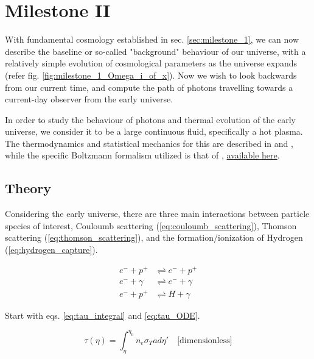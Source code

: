 \section{Milestone II}\label{sec:milestone_2}
With fundamental cosmology established in sec. \ref{sec:milestone_1}, we can now describe the baseline or so-called "background" behaviour of our universe, with a relatively simple evolution of cosmological parameters as the universe expands (refer fig. \ref{fig:milestone_1_Omega_i_of_x}). Now we wish to look backwards from our current time, and compute the path of photons travelling towards a current-day observer from the early universe.

In order to study the behaviour of photons and thermal evolution of the early universe, we consider it to be a large continuous fluid, specifically a hot plasma. The thermodynamics and statistical mechanics for this are described in \citet[chap.~3]{baumannLectureNotesCosmology2017} and \citet[chap.~3,4]{dodelsonModernCosmology2003}, while the specific Boltzmann formalism utilized is that of \citet{wintherCosmologyIILecture2024}, \href{https://cmb.wintherscoming.no/theory_thermodynamics.php#thermo}{available here}.

\subsection{Theory}
Considering the early universe, there are three main interactions between particle species of interest, Couloumb scattering (\ref{eq:couloumb_scattering}), Thomson scattering (\ref{eq:thomson_scattering}), and the formation/ionization of Hydrogen (\ref{eq:hydrogen_capture}).

\begin{align}
e^- + p^+ &\rightleftharpoons e^- + p^+ \label{eq:couloumb_scattering} \\
e^- + \gamma &\rightleftharpoons e^- + \gamma \label{eq:thomson_scattering} \\
e^- + p^+ &\rightleftharpoons H + \gamma \label{eq:hydrogen_capture}
\end{align}

Start with eqs. \ref{eq:tau_integral} \citep[sec.~4.4]{dodelsonModernCosmology2003} and \ref{eq:tau_ODE}.

\begin{equation}\label{eq:tau_integral}
\tau(\eta) = \int_{\eta}^{\eta_0} n_e \sigma_T a d\eta' \quad \text{[dimensionless]}
\end{equation}

